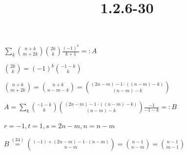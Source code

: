 \documentclass{article}
\title{1.2.6-30}
\begin{document}
\maketitle

\( \sum_{k} \binom{n+k}{m+2k}\binom{2k}{k}\frac{(-1)^k}{k+1} =: A \)

\( \binom{2k}{k} = (-1)^k\binom{-1-k}{k} \)

\( \binom{n+k}{m+2k} = \binom{n+k}{n-m-k} = \binom{(2n-m) - 1\cdot((n-m)-k)}{(n-m)-k} \)

\( A = \sum_k \binom{-1-k}{k}\binom{(2n-m) - 1\cdot((n-m)-k)}{(n-m)-k}\frac{-1}{-1-k} =: B \)

\( r = -1, t = 1, s = 2n-m, n = n-m \)

\( B \overset{(34)}{=} \binom{(-1)+(2n-m)-1\cdot(n-m)}{n-m} = \binom{n - 1}{n-m} = \binom{n-1}{m-1} \)
\end{document}
